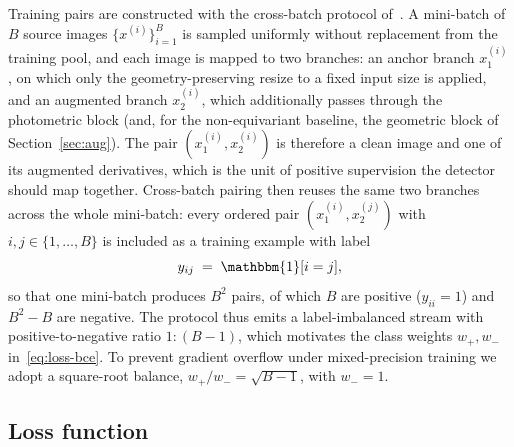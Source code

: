 \documentclass{article}
\begin{document}
Training pairs are constructed with the cross-batch protocol of~\citet{dorin2024pairwise}. A mini-batch of $B$ source images $\{x^{(i)}\}_{i=1}^{B}$ is sampled uniformly without replacement from the training pool, and each image is mapped to two branches: an anchor branch $x^{(i)}_1$, on which only the geometry-preserving resize to a fixed input size is applied, and an augmented branch $x^{(i)}_2$, which additionally passes through the photometric block (and, for the non-equivariant baseline, the geometric block of Section~\ref{sec:aug}). The pair $(x^{(i)}_1, x^{(i)}_2)$ is therefore a clean image and one of its augmented derivatives, which is the unit of positive supervision the detector should map together. Cross-batch pairing then reuses the same two branches across the whole mini-batch: every ordered pair $(x^{(i)}_1, x^{(j)}_2)$ with $i, j\in\{1, \ldots, B\}$ is included as a training example with label
\begin{equation}\label{eq:cross-batch-label}
  y_{ij} \;=\; \mathbbm{1}[i = j],
\end{equation}
so that one mini-batch produces $B^2$ pairs, of which $B$ are positive ($y_{ii} = 1$) and $B^2 - B$ are negative. The protocol thus emits a label-imbalanced stream with positive-to-negative ratio $1 : (B-1)$, which motivates the class weights $w_+, w_-$ in~\eqref{eq:loss-bce}. To prevent gradient overflow under mixed-precision training we adopt a square-root balance, $w_+ / w_- = \sqrt{B-1}$, with $w_- = 1$.

\subsection{Loss function}
\end{document}
